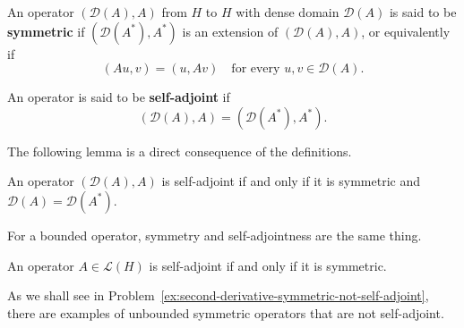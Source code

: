 \begin{Definition}
\label{def:symmetric-operator}
An operator $(\mathcal{D}(A),A)$ from $H$ to $H$ with dense domain $\mathcal{D}(A)$ is said to be \textbf{symmetric} if $(\mathcal{D}(A^*),A^*)$ is an extension of $(\mathcal{D}(A),A)$, or equivalently if
\begin{equation}\label{eq:symmetric-operator-pairing-identity}
(Au,v)=(u,Av)\quad\text{for every }u,v\in\mathcal{D}(A).
\end{equation}

\end{Definition}

\begin{Definition}
\label{def:self-adjoint-operator}
An operator is said to be \textbf{self-adjoint} if
\begin{equation}\label{eq:self-adjoint-operator-domain-action-equality}
(\mathcal{D}(A),A)=(\mathcal{D}(A^*),A^*).
\end{equation}

\end{Definition}

The following lemma is a direct consequence of the definitions.

\begin{Lemma}
\label{lem:self-adjoint-symmetric-domain-equality}
An operator $(\mathcal{D}(A),A)$ is self-adjoint if and only if it is symmetric and $\mathcal{D}(A)=\mathcal{D}(A^*)$.
\end{Lemma}

For a bounded operator, symmetry and self-adjointness are the same thing.

\begin{Theorem}
\label{thm:bounded-symmetric-operator-self-adjoint}
An operator $A\in\mathcal{L}(H)$ is self-adjoint if and only if it is symmetric.
\end{Theorem}

\begingroup
{}
\renewcommand{\endProof}{\par\nobreak\hfill$\blacksquare$\par\vspace{0.1cm}}
\endgroup

As we shall see in Problem~\ref{ex:second-derivative-symmetric-not-self-adjoint}, there are examples of unbounded symmetric operators that are not self-adjoint.

